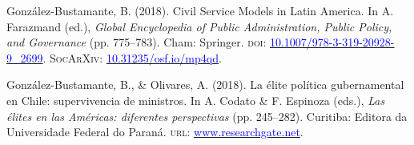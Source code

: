 \begin{publications}

\begin{benumerate}{12}

\item{González-Bustamante, B. (2018). Civil Service Models in Latin America. In A. Farazmand (ed.), {\itshape Global Encyclopedia of Public Administration, Public Policy, and Governance} (pp. 775--783). Cham: Springer. {\scshape doi:} \href{https://doi.org/10.1007/978-3-319-20928-9\_2699}{\textcolor{blue}{10.1007/978-3-319-20928-9\_2699}}. {\scshape \footnotesize SocArXiv:} \href{https://doi.org/10.31235/osf.io/mp4qd}{\textcolor{blue}{10.31235/osf.io/mp4qd}}.}\vspace{1mm}


\item{González-Bustamante, B., \& Olivares, A. (2018). La élite política gubernamental en Chile: supervivencia de ministros. In A. Codato \& F. Espinoza (eds.), {\itshape Las élites en las Américas: diferentes perspectivas} (pp. 245--282). Curitiba: Editora da Universidade Federal do Paraná. {\scshape url:} \href{https://www.researchgate.net/publication/325699783_Elites_en_las_Americas_diferentes_perspectivas_Elites_in_the_Americas_Different_Perspectives}{\textcolor{blue}{www.researchgate.net}}.}\vspace{1mm}



\end{benumerate}
\end{publications}
